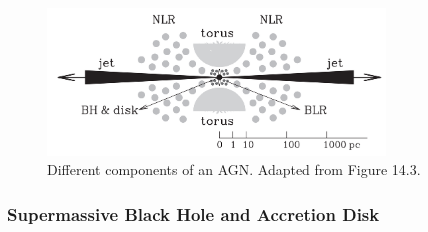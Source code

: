 \begin{figure}[!ht]
	\centering
	\includegraphics[width=0.8\textwidth]{pictures/Chapter2/AGN_standard_paradigm.png}
	\caption{Different components of an AGN. Adapted from \textcite{mo2010galaxy} Figure 14.3.}
	\label{fig:agn_structure_mo}
\end{figure}

\subsubsection{Supermassive Black Hole and Accretion Disk}


